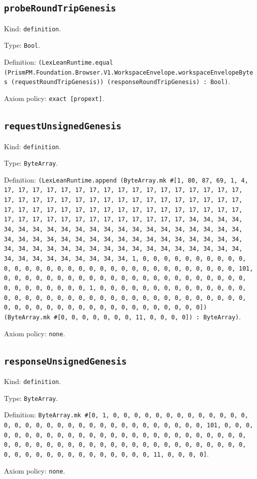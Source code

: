 \documentclass[11pt]{article}
\begin{document}
\subsection*{\texttt{probeRoundTripGenesis}}
\noindent Kind: \texttt{definition}.\par
\noindent Type: \texttt{Bool}.\par
\noindent Definition: \texttt{(LexLeanRuntime.equal (PrismPM.Foundation.Browser.V1.WorkspaceEnvelope.workspaceEnvelopeBytes (requestRoundTripGenesis)) (responseRoundTripGenesis) : Bool)}.\par
\noindent Axiom policy: \texttt{exact [propext]}.\par
\subsection*{\texttt{requestUnsignedGenesis}}
\noindent Kind: \texttt{definition}.\par
\noindent Type: \texttt{ByteArray}.\par
\noindent Definition: \texttt{(LexLeanRuntime.append (ByteArray.mk \#[1, 80, 87, 69, 1, 4, 17, 17, 17, 17, 17, 17, 17, 17, 17, 17, 17, 17, 17, 17, 17, 17, 17, 17, 17, 17, 17, 17, 17, 17, 17, 17, 17, 17, 17, 17, 17, 17, 17, 17, 17, 17, 17, 17, 17, 17, 17, 17, 17, 17, 17, 17, 17, 17, 17, 17, 17, 17, 17, 17, 17, 17, 17, 17, 17, 17, 17, 17, 17, 17, 34, 34, 34, 34, 34, 34, 34, 34, 34, 34, 34, 34, 34, 34, 34, 34, 34, 34, 34, 34, 34, 34, 34, 34, 34, 34, 34, 34, 34, 34, 34, 34, 34, 34, 34, 34, 34, 34, 34, 34, 34, 34, 34, 34, 34, 34, 34, 34, 34, 34, 34, 34, 34, 34, 34, 34, 34, 34, 34, 34, 34, 34, 34, 34, 1, 0, 0, 0, 0, 0, 0, 0, 0, 0, 0, 0, 0, 0, 0, 0, 0, 0, 0, 0, 0, 0, 0, 0, 0, 0, 0, 0, 0, 0, 0, 0, 0, 101, 0, 0, 0, 0, 0, 0, 0, 0, 0, 0, 0, 0, 0, 0, 0, 0, 0, 0, 0, 0, 0, 0, 0, 0, 0, 0, 0, 0, 0, 0, 0, 1, 0, 0, 0, 0, 0, 0, 0, 0, 0, 0, 0, 0, 0, 0, 0, 0, 0, 0, 0, 0, 0, 0, 0, 0, 0, 0, 0, 0, 0, 0, 0, 0, 0, 0, 0, 0, 0, 0, 0, 0, 0, 0, 0, 0, 0, 0, 0, 0, 0, 0, 0, 0, 0, 0, 0, 0]) (ByteArray.mk \#[0, 0, 0, 0, 0, 0, 0, 11, 0, 0, 0, 0]) : ByteArray)}.\par
\noindent Axiom policy: \texttt{none}.\par
\subsection*{\texttt{responseUnsignedGenesis}}
\noindent Kind: \texttt{definition}.\par
\noindent Type: \texttt{ByteArray}.\par
\noindent Definition: \texttt{ByteArray.mk \#[0, 1, 0, 0, 0, 0, 0, 0, 0, 0, 0, 0, 0, 0, 0, 0, 0, 0, 0, 0, 0, 0, 0, 0, 0, 0, 0, 0, 0, 0, 0, 0, 0, 0, 101, 0, 0, 0, 0, 0, 0, 0, 0, 0, 0, 0, 0, 0, 0, 0, 0, 0, 0, 0, 0, 0, 0, 0, 0, 0, 0, 0, 0, 0, 0, 0, 0, 0, 0, 0, 0, 0, 0, 0, 0, 0, 0, 0, 0, 0, 0, 0, 0, 0, 0, 0, 0, 0, 0, 0, 0, 0, 0, 0, 0, 0, 0, 0, 11, 0, 0, 0, 0]}.\par
\noindent Axiom policy: \texttt{none}.\par
\end{document}
